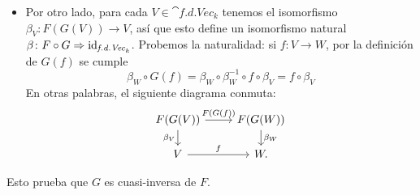 \begin{sol}
\begin{itemize}
\item Por otro lado, para cada $V\in\cat{f.d.Vec}_k$ tenemos el isomorfismo
$\beta_V\colon F(G(V))\to V$, así que esto define un isomorfismo natural $\beta \colon F \circ G \Rightarrow \operatorname{id}_{\textit{f.d.Vec}_k}$. Probemos la naturalidad: si $f\colon V\to W$, por la
definición de $G(f)$ se cumple
\[
\beta_W\circ G(f)
=\beta_W \circ \beta_W^{-1}\circ f\circ\beta_V
= f\circ\beta_V
\]
En otras palabras, el siguiente diagrama conmuta:
\[
\begin{tikzcd}[row sep = 1.4em]
F(G(V)) \arrow[r,"F(G(f))"] \arrow[d,"\beta_V"'] &
F(G(W)) \arrow[d,"\beta_W"]\\
V \arrow[r,"f"] & W.
\end{tikzcd}
\]
\end{itemize}
Esto prueba que $G$ es cuasi-inversa de $F$.
\end{sol}